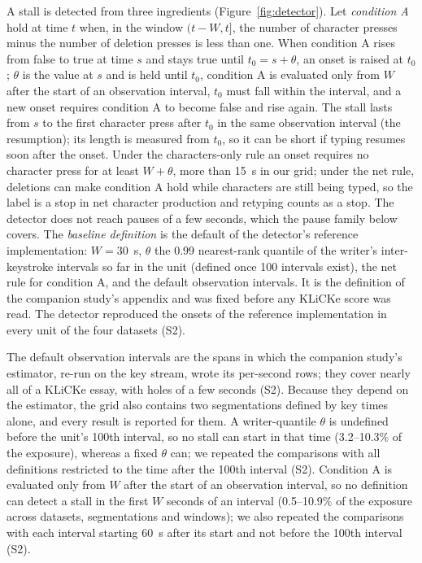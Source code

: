 A stall is detected from three ingredients (Figure~\ref{fig:detector}). Let \emph{condition A} hold at time $t$ when,
in the window $(t - W, t]$, the number of character presses minus the number of deletion presses is less than one. When
condition A rises from false to true at time $s$ and stays true until $t_0 = s + \theta$, an onset is raised at $t_0$;
$\theta$ is the value at $s$ and is held until $t_0$, condition A is evaluated only from $W$ after the start of an
observation interval, $t_0$ must fall within the interval, and a new onset requires condition A to become false and
rise again.
The stall lasts from $s$ to the first character press after $t_0$ in the same observation interval (the
resumption); its length is
measured from $t_0$, so it can be short if typing resumes soon after the onset. Under the characters-only rule an onset
requires no character press for at least $W + \theta$, more than 15~s in our grid; under the net rule, deletions can make
condition A hold while characters are still being typed, so the label is a stop in net character production and
retyping counts as a stop. The detector does not reach pauses of a few seconds, which the pause family below covers. The \emph{baseline definition} is
the default of the detector's reference implementation: $W = 30$~s, $\theta$ the 0.99 nearest-rank quantile of the
writer's inter-keystroke intervals so far in the unit (defined once 100 intervals exist), the net rule for condition A,
and the default observation intervals. It is the definition of the companion study's appendix and was fixed before any
KLiCKe score was read. The detector reproduced the onsets of the reference implementation in every unit of the four
datasets (S2).

The default observation intervals are the spans in which the companion study's estimator, re-run on the key stream,
wrote its per-second rows; they cover nearly all of a KLiCKe essay, with holes of a few seconds (S2). Because they
depend on the estimator, the grid also contains two segmentations defined by key times alone, and every result is
reported for them. A writer-quantile $\theta$ is undefined before the unit's 100th interval, so no stall can start in
that time (3.2--10.3\% of the exposure), whereas a fixed $\theta$ can; we repeated the comparisons with all
definitions restricted to the time after the 100th interval (S2). Condition A is evaluated only from $W$ after the
start of an observation interval, so no definition can detect a stall in the first $W$ seconds of an interval
(0.5--10.9\% of the exposure across datasets, segmentations and windows); we also repeated the comparisons with each
interval starting 60~s after its start and not before the 100th interval (S2).

